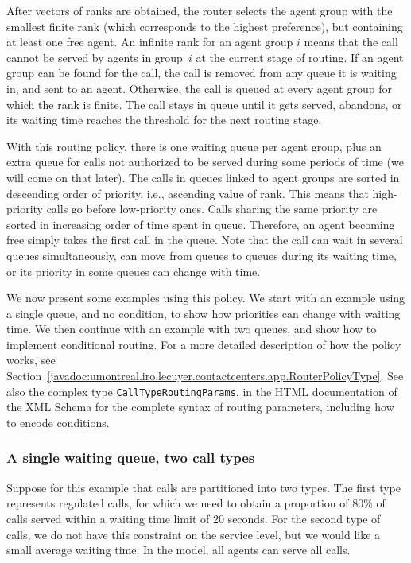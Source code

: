 After vectors of ranks are obtained,
the router selects the agent group with the smallest finite rank (which
corresponds to the highest preference), but containing at least one
free agent.  An infinite rank for an agent group $i$ means that the
call cannot be served by agents in group~$i$ at the current stage of
routing.
If an agent group can be found for the call, the call is removed from
any queue it is waiting in, and sent to an agent.
Otherwise,
the call is queued at every agent group for which the rank is finite.
The call stays in queue until it gets served, abandons, or its waiting
time reaches the threshold for the next routing stage.

With this routing policy, there is one waiting queue per agent group,
plus an extra queue for calls not authorized to be served during some
periods of time (we will come on that later).  The calls in queues
linked to agent groups are sorted in descending order of priority, i.e.,
ascending value of rank. This means that high-priority calls go before
low-priority ones.
Calls sharing the same priority are sorted in
increasing order of time spent in queue.
Therefore, an agent becoming free simply takes the first call in the
queue.
Note that the call can wait in several queues simultaneously, can move
from queues to queues during its waiting time, or its priority in some
queues can change with time.

We now present some examples using this policy.
We start with an example using a single queue, and no condition, to
show how priorities can change with waiting time.
We then continue with an example with two queues, and show how to
implement conditional routing.
For a more detailed description of how the policy works, see
Section~\ref{javadoc:umontreal.iro.lecuyer.contactcenters.app.RouterPolicyType}.
See also the complex type \texttt{Call\-Type\-Routing\-Params}, in the
HTML documentation of the XML Schema for the complete syntax
of routing parameters, including how to encode conditions.

\subsubsection{A single waiting queue, two call types}

Suppose for this example that calls are partitioned into two
types. The first type represents regulated calls, for which we need to
obtain a proportion of 80\% of calls served within a
waiting time limit of 20
seconds.
For the second type of calls, we do not have this constraint on the
service level, but we would like a small average waiting time.
In the model, all agents can serve all calls.

